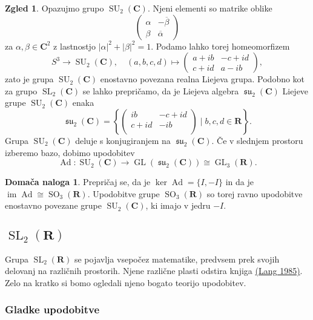 \documentclass[11pt]{book}
\def\RR{\mathbf{R}}
\def\CC{\mathbf{C}}
\DeclareMathOperator\image{im}
\DeclareMathOperator\SU{SU}
\DeclareMathOperator\GL{GL}
\DeclareMathOperator\sufrak{\mathfrak{su}}
\DeclareMathOperator\SL{SL}
\DeclareMathOperator\SO{SO}
\DeclareMathOperator\Ad{Ad}
\theoremstyle{definition}
\theoremstyle{zgled}
\newtheorem*{zgled}{Zgled}
\theoremstyle{odprtproblem}
\theoremstyle{domacanaloga}
\newtheorem*{domacanaloga}{Domača naloga}
\theoremstyle{izrek}
\begin{document}
\begin{zgled}
Opazujmo grupo $\SU_2(\CC)$. Njeni elementi so matrike oblike
\[
    \begin{pmatrix}
        \alpha & - \overline{\beta} \\
        \beta & \overline{\alpha}
    \end{pmatrix}
\]
za $\alpha, \beta \in \CC^2$ z lastnostjo $|\alpha|^2 + |\beta|^2 = 1$. Podamo lahko torej homeomorfizem
\[
    S^3 \to \SU_2(\CC), \quad
    (a,b,c,d) \mapsto     
    \begin{pmatrix}
        a + i b & - c + i d \\
        c + i d & a - i b
    \end{pmatrix},
\]
zato je grupa $\SU_2(\CC)$ enostavno povezana realna Liejeva grupa. Podobno kot za grupo $\SL_2(\CC)$ se lahko prepričamo, da je Liejeva algebra $\sufrak_2(\CC)$ Liejeve grupe $\SU_2(\CC)$ enaka
    \[
        \sufrak_2(\CC) = \left\{ \begin{pmatrix} i b & -c + i d \\ c + i d & - i b \\  \end{pmatrix} \mid b,c,d \in \RR \right\}.
    \]
Grupa $\SU_2(\CC)$ deluje s konjugiranjem na $\sufrak_2(\CC)$. Če v slednjem prostoru izberemo bazo, dobimo upodobitev
\[
    \Ad \colon \SU_2(\CC) \to \GL(\sufrak_2(\CC)) \cong \GL_3(\RR).
\]

\begin{domacanaloga}
    Prepričaj se, da je $\ker \Ad = \{ I, -I \}$ in da je $\image \Ad \cong \SO_3(\RR)$. Upodobitve grupe $\SO_3(\RR)$ so torej ravno upodobitve enostavno povezane grupe $\SU_2(\CC)$, ki imajo v jedru $-I$.
\end{domacanaloga}

\end{zgled}

\subsection{$\SL_2(\RR)$}

Grupa $\SL_2(\RR)$ se pojavlja vsepočez matematike, predvsem prek svojih delovanj na različnih prostorih. Njene različne plasti odstira knjiga \href{https://link.springer.com/book/10.1007/978-1-4612-5142-2}{(Lang 1985)}. Zelo na kratko si bomo ogledali njeno bogato teorijo upodobitev.

\subsubsection{Gladke upodobitve}
\end{document}
